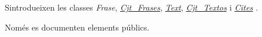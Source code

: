 S\textquotesingle{}introdueixen les classes {\itshape Frase}, {\itshape \hyperlink{class_cjt___frases}{Cjt\+\_\+\+Frases}}, {\itshape \hyperlink{class_text}{Text}}, {\itshape \hyperlink{class_cjt___textos}{Cjt\+\_\+\+Textos}} i {\itshape \hyperlink{class_cites}{Cites}} .

Només es documenten elements públics. 